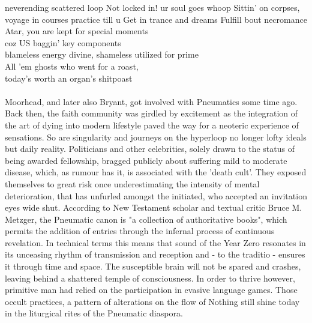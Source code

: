\documentclass{article}
\begin{document}
neverending scattered loop 
Not locked in! ur soul goes whoop 
Sittin' on corpses, voyage in courses 
practice till u Get in trance 
and dreams Fulfill bout necromance \\

Atar, you are kept for special moments \\
coz US baggin' key components \\
blameless energy divine, shameless utilized for prime \\
All 'em ghosts who went for a roast, \\ 
today's worth an organ's shitpoast \\

\paragraph{}
Moorhead, and later also Bryant, got involved  
with Pneumatics some time ago.
Back then, the faith community was girdled by excitement 
as the integration of the art of dying into modern lifestyle
paved the way for a neoteric experience of sensations.
So are singularity and journeys on the hyperloop
no longer lofty ideals but daily reality.
Politicians and other celebrities, 
solely drawn to the status of being awarded fellowship, 
bragged publicly about suffering mild to moderate disease, 
which, as rumour has it, is associated with the 'death cult'. 
They exposed themselves to great risk once
underestimating the intensity of mental deterioration, 
that has unfurled amongst the initiated, 
who accepted an invitation eyes wide shut.
According to New Testament scholar and textual critic Bruce M. Metzger, the Pneumatic canon is "a collection of authoritative books", 
which permits the addition of entries 
through the infernal process of continuous revelation.
In technical terms this means that
sound of the Year Zero resonates 
in its unceasing rhythm of transmission and reception 
and - to the traditio - ensures it through time and space.
The susceptible brain will not be spared
and crashes, leaving
behind a shattered temple of consciousness.
In order to thrive however,
primitive man had relied on the participation 
in evasive language games.
Those occult practices, 
a pattern of alterations on the flow of Nothing
still shine today in the liturgical rites 
of the Pneumatic diaspora.
\end{document}
